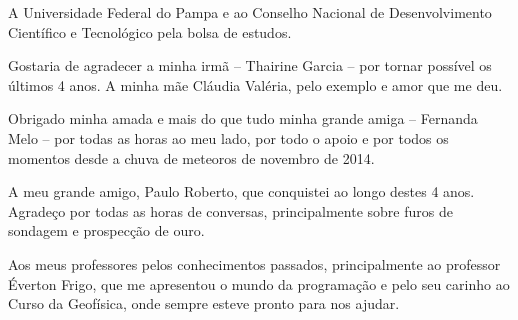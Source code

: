 \documentclass[12pt,twoside,oneright,a4paper,chapter=TITLE,english,brazil]{unipampa}
\begin{document}
\begin{agradecimentos}
    A Universidade Federal do Pampa e ao Conselho Nacional de Desenvolvimento Científico e Tecnológico pela bolsa de estudos. 
    
    \SingleSpacing
    \OnehalfSpacing
    
    \noindent Gostaria de agradecer a minha irmã -- Thairine Garcia -- por tornar possível os últimos 4 anos. A minha mãe Cláudia Valéria, pelo exemplo e amor que me deu.
    
    \SingleSpacing
    \OnehalfSpacing
    
    \noindent Obrigado minha amada e mais do que tudo minha grande amiga -- Fernanda Melo -- por todas as horas ao meu lado, por todo o apoio e por todos os momentos desde a chuva de meteoros de novembro de 2014.
    
    
    \SingleSpacing
    \OnehalfSpacing
    
    \noindent A meu grande amigo, Paulo Roberto, que conquistei ao longo destes 4 anos. Agradeço por todas as horas de conversas, principalmente sobre furos de sondagem e prospecção de ouro.  
    
    \SingleSpacing
    \OnehalfSpacing
    
    
    \noindent Aos meus professores pelos conhecimentos passados, principalmente ao professor Éverton Frigo, que me apresentou o mundo da programação e pelo seu carinho ao Curso da Geofísica, onde sempre esteve pronto para nos ajudar. 
    
    \SingleSpacing
    \OnehalfSpacing
    
    

\end{agradecimentos}
\end{document}

